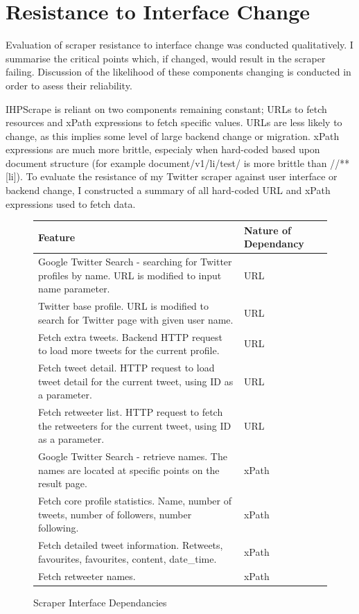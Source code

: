 \section{Resistance to Interface Change}

Evaluation of scraper resistance to interface change was conducted qualitatively. I summarise the critical points which, if changed, would result in the scraper failing. Discussion of the likelihood of these components changing is conducted in order to asess their reliability. 

IHPScrape is reliant on two components remaining constant; URLs to fetch resources and xPath expressions to fetch specific values. URLs are less likely to change, as this implies some level of large backend change or migration. xPath expressions are much more brittle, especialy when hard-coded based upon document structure (for example document/v1/li/test/ is more brittle than //**[li]). To evaluate the resistance of my Twitter scraper against user interface or backend change, I constructed a summary of all hard-coded URL and xPath expressions used to fetch data.

\begin{figure}[h!]
\begin{center}
  \begin{tabular}{| p{9cm} | l | }
  \hline
   \textbf{Feature} & \textbf{Nature of Dependancy}  \\ \hline
   Google Twitter Search - searching for Twitter profiles by name. URL is modified to input name parameter. & URL \\ \hline
   Twitter base profile. URL is modified to search for Twitter page with given user name. & URL \\ \hline
   Fetch extra tweets. Backend HTTP request to load more tweets for the current profile. & URL  \\ \hline
   Fetch tweet detail. HTTP request to load tweet detail for the current tweet, using ID as a parameter.& URL \\ \hline
   Fetch retweeter list. HTTP request to fetch the retweeters for the current tweet, using ID as a parameter.& URL \\ \hline
   Google Twitter Search - retrieve names. The names are located at specific points on the result page.& xPath \\ \hline
   Fetch core profile statistics. Name, number of tweets, number of followers, number following.&  xPath \\ \hline
   Fetch detailed tweet information. Retweets, favourites, favourites, content, date\_time.&  xPath \\ \hline
   Fetch retweeter names. &xPath \\ \hline
  \end{tabular}  
\end{center}
\caption{Scraper Interface Dependancies}
\end{figure}

